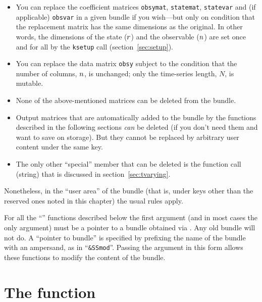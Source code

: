 \begin{itemize}
\item You can replace the coefficient matrices \texttt{obsymat},
  \texttt{statemat}, \texttt{statevar} and (if applicable)
  \texttt{obsvar} in a given bundle if you wish---but only on
  condition that the replacement matrix has the same dimensions as the
  original. In other words, the dimensions of the state ($r$) and
  the observable ($n$) are set once and for all by the
  \texttt{ksetup} call (section~\ref{sec:setup}).
\item You can replace the data matrix \texttt{obsy} subject to the
  condition that the number of columns, $n$, is unchanged; only
  the time-series length, $N$, is mutable.
\item None of the above-mentioned matrices can be deleted from the
  bundle.
\item Output matrices that are automatically added to the bundle by
  the functions described in the following sections \textit{can} be
  deleted (if you don't need them and want to save on storage). But
  they cannot be replaced by arbitrary user content under the same
  key.
\item The only other ``special'' member that can be deleted is the
  function call (string) that is discussed in
  section~\ref{sec:tvarying}.
\end{itemize}

Nonetheless, in the ``user area'' of the bundle (that is, under keys
other than the reserved ones noted in this chapter) the usual rules
apply.

For all the ``'' functions described below the first argument
(and in most cases the only argument) must be a pointer to a bundle
obtained via . Any old bundle will not do. A ``pointer to
bundle'' is specified by prefixing the name of the bundle with an
ampersand, as in ``\verb|&SSmod|''. Passing the argument in this
form allows these functions to modify the content of the bundle.

\section{The  function}
\label{sec:kfilter}

